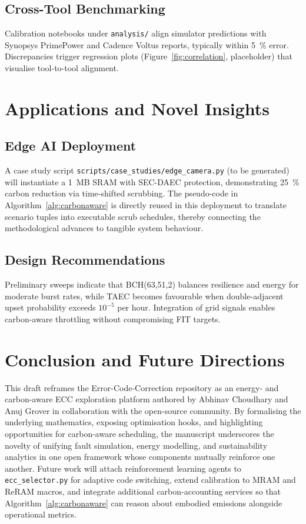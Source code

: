 \documentclass[conference]{IEEEtran}
\begin{document}
\subsection{Cross-Tool Benchmarking}
Calibration notebooks under \texttt{analysis/} align simulator predictions with Synopsys PrimePower and Cadence Voltus reports, typically within \SI{5}{\percent} error.
Discrepancies trigger regression plots (Figure~\ref{fig:correlation}, placeholder) that visualise tool-to-tool alignment.

\section{Applications and Novel Insights}
\subsection{Edge AI Deployment}
A case study script \texttt{scripts/case\_studies/edge\_camera.py} (to be generated) will instantiate a 1~MB SRAM with SEC-DAEC protection, demonstrating \SI{25}{\percent} carbon reduction via time-shifted scrubbing.
The pseudo-code in Algorithm~\ref{alg:carbonaware} is directly reused in this deployment to translate scenario tuples into executable scrub schedules, thereby connecting the methodological advances to tangible system behaviour.
\subsection{Design Recommendations}
Preliminary sweeps indicate that BCH(63,51,2) balances resilience and energy for moderate burst rates, while TAEC becomes favourable when double-adjacent upset probability exceeds $10^{-5}$ per hour.
Integration of grid signals enables carbon-aware throttling without compromising FIT targets.

\section{Conclusion and Future Directions}
This draft reframes the Error-Code-Correction repository as an energy- and carbon-aware ECC exploration platform authored by Abhinav Choudhary and Anuj Grover in collaboration with the open-source community.
By formalising the underlying mathematics, exposing optimisation hooks, and highlighting opportunities for carbon-aware scheduling, the manuscript underscores the novelty of unifying fault simulation, energy modelling, and sustainability analytics in one open framework whose components mutually reinforce one another.
Future work will attach reinforcement learning agents to \texttt{ecc\_selector.py} for adaptive code switching, extend calibration to MRAM and ReRAM macros, and integrate additional carbon-accounting services so that Algorithm~\ref{alg:carbonaware} can reason about embodied emissions alongside operational metrics.
\end{document}
